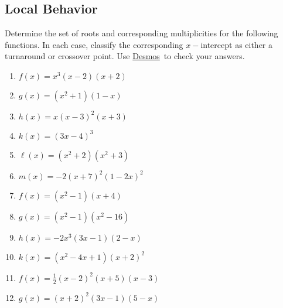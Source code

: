 \documentclass[12pt]{book}
\theoremstyle{definition}
\newcommand{\Desmos}{\href{https://www.desmos.com/}{Desmos}}
\begin{document}
\subsection*{Local Behavior}
Determine the set of roots and corresponding multiplicities for the following functions.  In each case, classify the corresponding $x-$intercept as either a turnaround or crossover point.  Use \Desmos \ to check your answers.
\begin{multicols}{2}
\begin{enumerate}
\item $f(x)=x^3(x-2)(x+2)$
\item $g(x)=(x^2+1)(1-x)$
\item $h(x)=x(x-3)^2(x+3)$
\item $k(x)=(3x-4)^3$
\item $\ell(x)=(x^2+2)(x^2+3)$
\item $m(x)=-2(x+7)^2(1-2x)^2$
\item $f(x)=(x^2-1)(x+4)$
\item $g(x)=(x^2-1)(x^2-16)$
\item $h(x)=-2x^3(3x-1)(2-x)$
\item $k(x)=(x^2-4x+1)(x+2)^2$
\item $f(x)=\frac{1}{2}(x-2)^2(x+5)(x-3)$
\item $g(x)=(x+2)^2(3x-1)(5-x)$
\end{enumerate}
\end{multicols}
\end{document}
